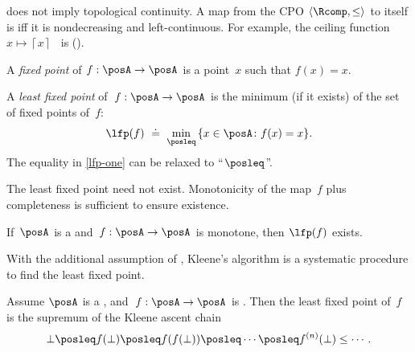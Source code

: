 \begin{rem}
\scottcontinuity does not imply topological continuity. A map from
the CPO $\langle\Rcomp,\leq\rangle$ to itself is \scottcontinuous
iff it is nondecreasing and left-continuous. For example, the ceiling
function $x\mapsto\left\lceil x\right\rceil $~ is \scottcontinuous
().
\end{rem}

\emph{}

A \emph{fixed} \emph{point} of $f:\posA\rightarrow\posA$ is a point~$x$
such that $f(x)=x$. 
\begin{defn}
A \emph{least fixed point} of~$f:\posA\rightarrow\posA$ is the minimum
(if it exists) of the set of fixed points of~$f$:
\begin{equation}
\lfp(f)\,\,\doteq\,\,\min_{\posleq}\,\{x\in\posA\colon f(x)=x\}.\label{eq:lfp-one}
\end{equation}
The equality in \eqref{lfp-one} can be relaxed to ``$\posleq$''.
\end{defn}
The least fixed point need not exist. Monotonicity of the map~$f$
plus completeness is sufficient to ensure existence.
\begin{lem}
\label{lem:CPO-fix-point-2}If~$\posA$ is a \CPO and~$f:\posA\rightarrow\posA$
is monotone, then $\lfp(f)$ exists.
\end{lem}


With the additional assumption of \scottcontinuity, Kleene's algorithm
is a systematic procedure to find the least fixed point.
\begin{lem}
\label{lem:kleene-1}Assume $\posA$ is a \CPO, and~$f:\posA\rightarrow\posA$
is \scottcontinuous. Then the least fixed point of~$f$ is the supremum
of the Kleene ascent chain 
\[
\bot\posleq f(\bot)\posleq f(f(\bot))\posleq\cdots\posleq f^{(n)}(\bot)\leq\cdots.
\]
\end{lem}









